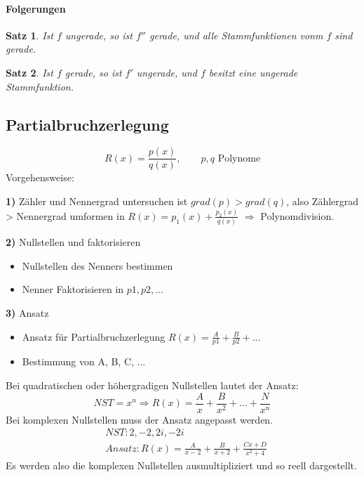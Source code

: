 \documentclass[12pt,a4paper]{report}%
\let\harvardleftorig\harvardleft
\newtheorem{satz}{Satz}[section]
\numberwithin{equation}{section}
\newcommand{\subsubsubsection}{\paragraph}
\newcommand\citevgl
{\def\harvardleft{(vgl.\ \global\let\harvardleft\harvardleftorig}%
 \cite
}
\numberwithin{equation}{subsection}
\begin{document}
\subsubsubsection{Folgerungen}
\begin{satz}
Ist $f$ ungerade, so ist $f''$ gerade, und alle Stammfunktionen vonm $f$ sind gerade.\citevgl{HM2Vortragsubung}
\end{satz}
\begin{satz}
Ist $f$ gerade, so ist $f'$ ungerade, und $f$ besitzt eine ungerade Stammfunktion.\citevgl{HM2Vortragsubung}
\end{satz}

\subsection{Partialbruchzerlegung}
	\begin{equation}
	  R(x) = \frac{p(x)}{q(x)}, \qquad p,q\text{ Polynome}
	\end{equation}
	Vorgehensweise:
	\begin{description}
	  \item{\textbf{1)}} Zähler und Nennergrad untersuchen\newline
	  ist $grad(p) > grad(q)$, also Zählergrad > Nennergrad umformen in  \newline$R(x) = p_1(x) + \frac{p_2(x)}{q(x)}$ $\Rightarrow$ Polynomdivision.
	  \item{\textbf{2)}} Nullstellen und faktorisieren
	    \begin{itemize}
	      \item Nullstellen des Nenners bestimmen
	      \item Nenner Faktorisieren in $p1, p2, ...$
	    \end{itemize}
	  \item{\textbf{3)}} Ansatz
	    \begin{itemize}
	      \item Ansatz für Partialbruchzerlegung $R(x) = \frac{A}{p1} + \frac{B}{p2} + ...$
	      \item Bestimmung von A, B, C, ...
	    \end{itemize}
	\end{description}
  Bei quadratischen oder höhergradigen Nullstellen lautet der Ansatz:
  \begin{equation}
    NST = x^n \Rightarrow R(x) = \frac{A}{x} + \frac{B}{x^2} + ... + \frac{N}{x^n}
  \end{equation}
  Bei komplexen Nullstellen muss der Ansatz angepasst werden.
  \begin{align}
    &NST: 2, -2, 2i, -2i \nonumber \\
    &Ansatz: R(x) = \frac{A}{x-2} + \frac{B}{x+2} + \frac{Cx + D}{x^2+4}
  \end{align}
  Es werden also die komplexen Nullstellen ausmultipliziert und so reell dargestellt.
  
\end{document}
